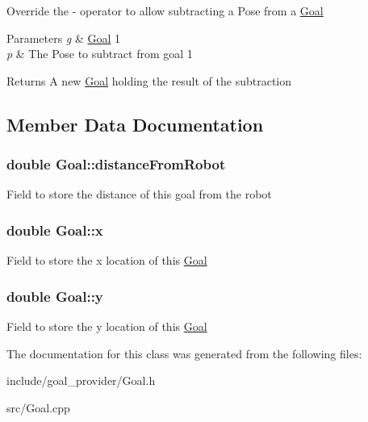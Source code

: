 \-Override the -\/ operator to allow subtracting a \-Pose from a \hyperlink{classGoal}{\-Goal} 
\begin{DoxyParams}{\-Parameters}
{\em g} & \hyperlink{classGoal}{\-Goal} 1 \\
\hline
{\em p} & \-The \-Pose to subtract from goal 1 \\
\hline
\end{DoxyParams}
\begin{DoxyReturn}{\-Returns}
\-A new \hyperlink{classGoal}{\-Goal} holding the result of the subtraction 
\end{DoxyReturn}


\subsection{\-Member \-Data \-Documentation}
\hypertarget{classGoal_a5b81dbab33309729a8f8ebc60deb9a15}{
\subsubsection[{distance\-From\-Robot}]{\setlength{\rightskip}{0pt plus 5cm}double {\bf \-Goal\-::distance\-From\-Robot}}}\label{classGoal_a5b81dbab33309729a8f8ebc60deb9a15}
\-Field to store the distance of this goal from the robot \hypertarget{classGoal_af6cd641b328568cc900da4bcc25a9a7a}{
\subsubsection[{x}]{\setlength{\rightskip}{0pt plus 5cm}double {\bf \-Goal\-::x}}}\label{classGoal_af6cd641b328568cc900da4bcc25a9a7a}
\-Field to store the x location of this \hyperlink{classGoal}{\-Goal} \hypertarget{classGoal_a12a0a145556d1f773e12a91a4c8ca36d}{
\subsubsection[{y}]{\setlength{\rightskip}{0pt plus 5cm}double {\bf \-Goal\-::y}}}\label{classGoal_a12a0a145556d1f773e12a91a4c8ca36d}
\-Field to store the y location of this \hyperlink{classGoal}{\-Goal} 

\-The documentation for this class was generated from the following files\-:\begin{DoxyCompactItemize}
\item 
include/goal\-\_\-provider/\-Goal.\-h\item 
src/\-Goal.\-cpp\end{DoxyCompactItemize}
